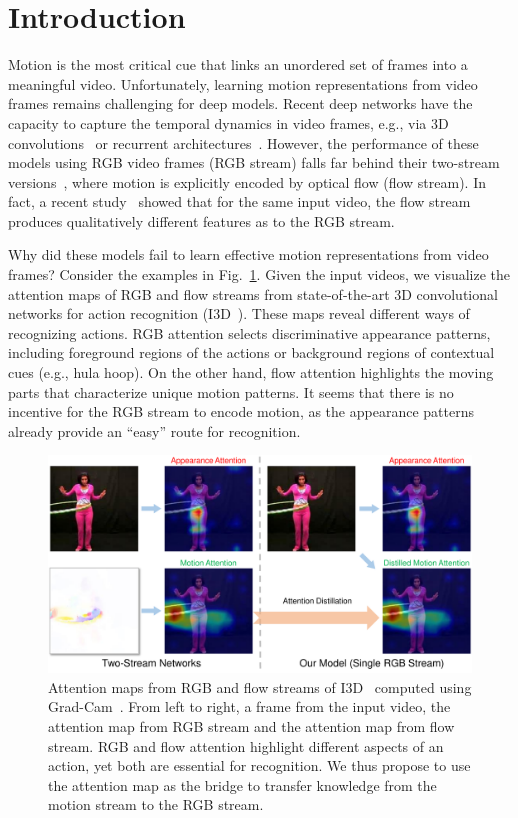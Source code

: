 \documentclass[10pt,twocolumn,letterpaper]{article}
\begin{document}
\section{Introduction}

Motion is the most critical cue that links an unordered set of frames into a meaningful video. Unfortunately, learning motion representations from video frames remains challenging for deep models. Recent deep networks have the capacity to capture the temporal dynamics in video frames, e.g., via 3D convolutions~\cite{tran2015learning} or recurrent architectures~\cite{donahue2015long}. However, the performance of these models using RGB video frames (RGB stream) falls far behind their two-stream versions~\cite{donahue2015long,carreira2017quo}, where motion is explicitly encoded by optical flow (flow stream). In fact, a recent study~\cite{Feichtenhofer_2018_CVPR} showed that for the same input video, the flow stream produces qualitatively different features as to the RGB stream.

Why did these models fail to learn effective motion representations from video frames? Consider the examples in Fig.\ \ref{fig:teaser}. Given the input videos, we visualize the attention maps of RGB and flow streams from state-of-the-art 3D convolutional networks for action recognition (I3D~\cite{carreira2017quo}). These maps reveal different ways of recognizing actions. RGB attention selects discriminative appearance patterns, including foreground regions of the actions or background regions of contextual cues (e.g., hula hoop). On the other hand, flow attention highlights the moving parts that characterize unique motion patterns. It seems that there is no incentive for the RGB stream to encode motion, as the appearance patterns already provide an ``easy'' route for recognition. 

\begin{figure}[t]
\centering
\includegraphics[width=1.0\linewidth]{latex/figures/teaser_new.pdf}
\caption{Attention maps from RGB and flow streams of I3D~\cite{carreira2017quo} computed using Grad-Cam~\cite{selvaraju2017grad}. From left to right, a frame from the input video, the attention map from RGB stream and the attention map from flow stream. RGB and flow attention highlight different aspects of an action, yet both are essential for recognition. We thus propose to use the attention map as the bridge to transfer knowledge from the motion stream to the RGB stream.} 
\label{fig:teaser}
\vspace{-1.0em}
\end{figure}
\end{document}
